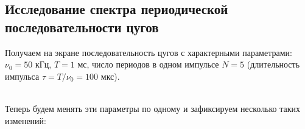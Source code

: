 \documentclass[a4paper,12pt]{article}
\begin{document}
\subsection*{Исследование спектра периодической последовательности цугов}
Получаем на экране последовательность цугов с характерными параметрами: $\nu_0 = 50$ кГц, $T = 1$ мс, число периодов в одном импульсе $N = 5$ (длительность импульса $\tau = T/\nu_0 = 100$ мкс).
\begin{figure}[h]
    \centering
\end{figure}\\
Теперь будем менять эти параметры по одному и зафиксируем несколько таких изменений:
\end{document}
